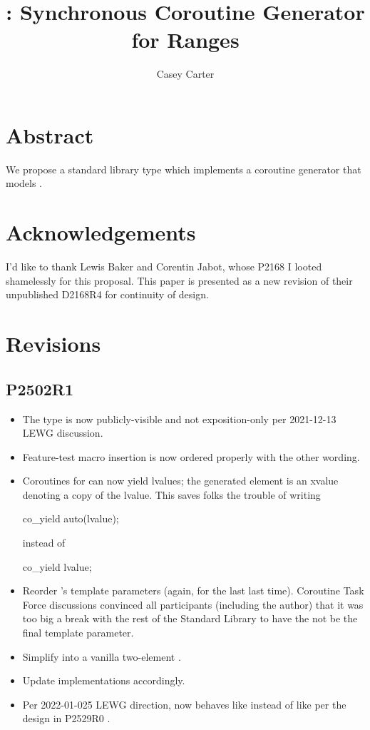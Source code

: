 \documentclass{wg21}
\title{\tcode{std::generator}: Synchronous Coroutine Generator for Ranges}
\author{Casey Carter}{Casey@Carter.net}
\begin{document}
\maketitle

\section{Abstract}

We propose a standard library type 
which implements a coroutine generator
that models .

\section{Acknowledgements}

I'd like to thank Lewis Baker and Corentin Jabot,
whose P2168 \cite{P2168R3} I looted shamelessly for this proposal.
This paper is presented as a new revision of
their unpublished D2168R4 for continuity of design.

\section{Revisions}

\subsection{P2502R1}
\begin{itemize}
\item The type 
  is now publicly-visible and not exposition-only
  per 2021-12-13 LEWG discussion.
\item Feature-test macro insertion is now
  ordered properly with the other wording.
\item Coroutines for  can now yield lvalues;
  the generated element is an xvalue denoting a copy of the lvalue.
  This saves folks the trouble of writing
  \begin{codeblock}
  co_yield auto(lvalue);
  \end{codeblock}
  instead of
  \begin{codeblock}
  co_yield lvalue;
  \end{codeblock}
\item Reorder 's template parameters
  (again, for the last last time).
  Coroutine Task Force discussions convinced all participants
  (including the author) that it was too big a break with
  the rest of the Standard Library to have the  not be
  the final template parameter.
\item Simplify  into a vanilla two-element .
\item Update implementations accordingly.
\item Per 2022-01-025 LEWG direction, 
  now behaves like 
  instead of like 
  per the design in P2529R0 \cite{P2529R0}.
\end{itemize}
\end{document}
